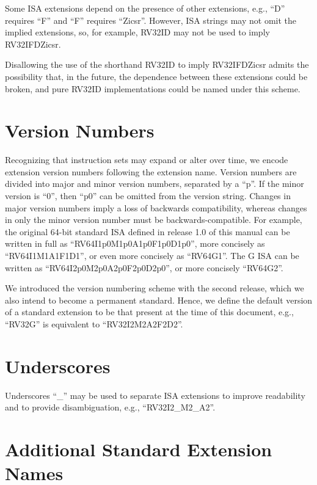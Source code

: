 Some ISA extensions depend on the presence of other extensions, e.g., ``D''
requires ``F'' and ``F'' requires ``Zicsr''.  However, ISA strings may not
omit the implied extensions, so, for example, RV32ID may not be used to imply
RV32IFDZicsr.

\begin{commentary}
Disallowing the use of the shorthand RV32ID to imply RV32IFDZicsr admits the
possibility that, in the future, the dependence between these extensions could
be broken, and pure RV32ID implementations could be named under this scheme.
\end{commentary}

\section{Version Numbers}
Recognizing that instruction sets may expand or alter over time, we
encode extension version numbers following the extension name.  Version
numbers are divided into major and minor version numbers, separated by
a ``p''.  If the minor version is ``0'', then ``p0'' can be omitted
from the version string.  Changes in major version numbers imply a
loss of backwards compatibility, whereas changes in only the minor
version number must be backwards-compatible.  For example, the
original 64-bit standard ISA defined in release 1.0 of this manual can
be written in full as ``RV64I1p0M1p0A1p0F1p0D1p0'', more concisely as
``RV64I1M1A1F1D1'', or even more concisely as ``RV64G1''.  The G ISA
can be written as ``RV64I2p0M2p0A2p0F2p0D2p0'', or more
concisely ``RV64G2''.

We introduced the version numbering scheme with the second release,
which we also intend to become a permanent standard.  Hence, we define
the default version of a standard extension to be that present at the
time of this document, e.g., ``RV32G'' is equivalent to
``RV32I2M2A2F2D2''.

\section{Underscores}

Underscores ``\_'' may be used to separate ISA extensions to
improve readability and to provide disambiguation, e.g., ``RV32I2\_M2\_A2''.

\section{Additional Standard Extension Names}

